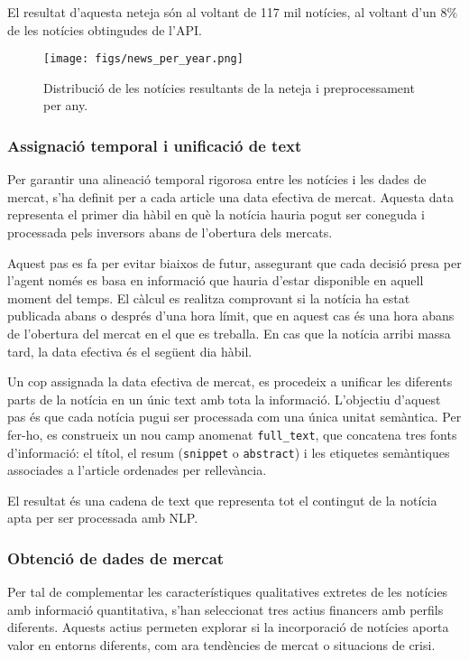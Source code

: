 \documentclass[12pt,a4paper,twoside]{book}
\begin{document}
El resultat d'aquesta neteja són al voltant de 117 mil notícies, al voltant d'un 8\% de les notícies obtingudes de l'API.
\begin{figure}[H]
	\centering
	\texttt{[image: figs/news\_per\_year.png]}
	\caption{Distribució de les notícies resultants de la neteja i preprocessament per any.}
	\label{fig:context-anoni1}
\end{figure}

\subsubsection*{Assignació temporal i unificació de text}

Per garantir una alineació temporal rigorosa entre les notícies i les dades de mercat, s'ha definit per a cada article una data efectiva de mercat. Aquesta data representa el primer dia hàbil en què la notícia hauria pogut ser coneguda i processada pels inversors abans de l'obertura dels mercats.

Aquest pas es fa per evitar biaixos de futur, assegurant que cada decisió presa per l'agent només es basa en informació que hauria d'estar disponible en aquell moment del temps. El càlcul es realitza comprovant si la notícia ha estat publicada abans o després d'una hora límit, que en aquest cas és una hora abans de l'obertura del mercat en el que es treballa. En cas que la notícia arribi massa tard, la data efectiva és el següent dia hàbil.

Un cop assignada la data efectiva de mercat, es procedeix a unificar les diferents parts de la notícia en un únic text amb tota la informació. L'objectiu d'aquest pas és que cada notícia pugui ser processada com una única unitat semàntica. Per fer-ho, es construeix un nou camp anomenat \texttt{full\_text}, que concatena tres fonts d'informació: el títol, el resum (\texttt{snippet} o \texttt{abstract}) i les etiquetes semàntiques associades a l'article ordenades per rellevància.

El resultat és una cadena de text que representa tot el contingut de la notícia apta per ser processada amb NLP.


\subsubsection{Obtenció de dades de mercat}

Per tal de complementar les característiques qualitatives extretes de les notícies amb informació quantitativa, s'han seleccionat tres actius financers amb perfils diferents. Aquests actius permeten explorar si la incorporació de notícies aporta valor en entorns diferents, com ara tendències de mercat o situacions de crisi.
\end{document}
